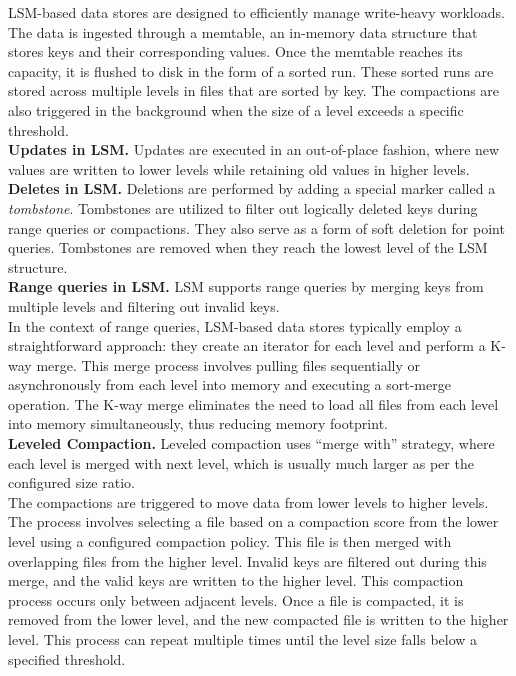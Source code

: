 LSM-based data stores are designed to efficiently manage write-heavy workloads. The data is ingested through 
a memtable, an in-memory data structure that stores keys and their corresponding values. Once the memtable reaches its 
capacity, it is flushed to disk in the form of a sorted run. These sorted runs are stored across multiple levels in 
files that are sorted by key. The compactions are also triggered in the background when the size of a level exceeds a 
specific threshold.\\
\textbf{Updates in LSM.} Updates are executed in an out-of-place fashion, where new values are written to lower levels 
while retaining old values in higher levels.\\
\textbf{Deletes in LSM.} Deletions are performed by adding a special marker called a \textit{tombstone}. Tombstones are 
utilized to filter out logically deleted keys during range queries or compactions. They also serve as a form of soft 
deletion for point queries. Tombstones are removed when they reach the lowest level of the LSM structure.\\
\textbf{Range queries in LSM.} LSM supports range queries by merging keys from multiple levels and filtering out 
invalid keys.\\
In the context of range queries, LSM-based data stores typically employ a straightforward approach: they create an 
iterator for each level and perform a K-way merge. This merge process involves pulling files sequentially or 
asynchronously from each level into memory and executing a sort-merge operation. The K-way merge eliminates the need 
to load all files from each level into memory simultaneously, thus reducing memory footprint.\\
\textbf{Leveled Compaction.} Leveled compaction uses ``merge with'' strategy, where each level is merged with 
next level, which is usually much larger as per the configured size ratio.\\
The compactions are triggered to move data from lower levels to higher levels. The process involves selecting a file 
based on a compaction score from the lower level using a configured compaction policy. This file is then merged with 
overlapping files from the higher level. Invalid keys are filtered out during this merge, and the valid keys are 
written to the higher level. This compaction process occurs only between adjacent levels. Once a file is compacted, 
it is removed from the lower level, and the new compacted file is written to the higher level. This process can repeat
multiple times until the level size falls below a specified threshold.